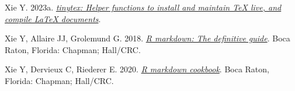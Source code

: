 \documentclass[10pt,a4paper]{article}
\newlength{\cslhangindent}
\newlength{\cslentryspacingunit} %
\newenvironment{CSLReferences}[2] %
 {%
  \setlength{\parindent}{0pt}
  \ifodd #1
  \let\oldpar\par
  \def\par{\hangindent=\cslhangindent\oldpar}
  \fi
  \setlength{\parskip}{#2\cslentryspacingunit}
 }%
 {}
\begin{document}
\begin{CSLReferences}{1}{0}
\leavevmode{}%
Xie Y. 2023a. \emph{\href{https://github.com/rstudio/tinytex}{{tinytex}: Helper functions to install and maintain TeX live, and compile LaTeX documents}}.

\leavevmode{}%
Xie Y, Allaire JJ, Grolemund G. 2018. \emph{\href{https://bookdown.org/yihui/rmarkdown}{R markdown: The definitive guide}}. Boca Raton, Florida: Chapman; Hall/CRC.

\leavevmode{}%
Xie Y, Dervieux C, Riederer E. 2020. \emph{\href{https://bookdown.org/yihui/rmarkdown-cookbook}{R markdown cookbook}}. Boca Raton, Florida: Chapman; Hall/CRC.

\end{CSLReferences}
\end{document}
